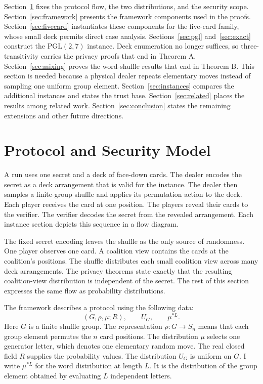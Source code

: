 \documentclass[runningheads]{llncs}
\newcommand{\PG}{\mathrm{PGL}(2,7)}
\begin{document}
Section~\ref{sec:model} fixes the protocol flow, the two distributions, and
the security scope. Section~\ref{sec:framework} presents the framework
components used in the proofs. Section~\ref{sec:fivecard} instantiates these
components for the five-card family, whose small deck permits direct case
analysis. Sections~\ref{sec:pgl} and~\ref{sec:exact} construct the $\PG$
instance. Deck enumeration no longer suffices, so three-transitivity carries
the privacy proofs that end in Theorem A. Section~\ref{sec:mixing} proves the
word-shuffle results that end in Theorem B. This section is needed because a
physical dealer repeats elementary moves instead of sampling one uniform group
element. Section~\ref{sec:instances} compares the additional instances and
states the trust base. Section~\ref{sec:related} places the results among
related work. Section~\ref{sec:conclusion} states the remaining extensions and
other future directions.

\section{Protocol and Security Model}\label{sec:model}

A run uses one secret and a deck of face-down cards. The dealer encodes the
secret as a deck arrangement that is valid for the instance. The dealer then
samples a finite-group shuffle and applies its permutation action to the deck.
Each player receives the card at one position. The players reveal their cards
to the verifier. The verifier decodes the secret from the revealed
arrangement. Each instance section depicts this sequence in a flow diagram.

The fixed secret encoding leaves the shuffle as the only source of randomness.
One player observes one card. A coalition view contains the cards at the
coalition's positions. The shuffle distributes each small coalition view
across many deck arrangements. The privacy theorems state exactly that the
resulting coalition-view distribution is independent of the secret. The rest
of this section expresses the same flow as probability distributions.

The framework describes a protocol using the following data:
\begin{equation}
  (G,\rho,\mu;R), \qquad U_G, \qquad \mu^{*L}.
  \label{eq:model-data}
\end{equation}
Here $G$ is a finite shuffle group. The representation $\rho:G\to S_n$ means
that each group element permutes the $n$ card positions. The distribution
$\mu$ selects one generator letter, which denotes one elementary random move.
The real closed field $R$ supplies the probability values. The distribution
$U_G$ is uniform on $G$. I write $\mu^{*L}$ for the word distribution at
length $L$. It is the distribution of the group element obtained by evaluating
$L$ independent letters.
\end{document}
